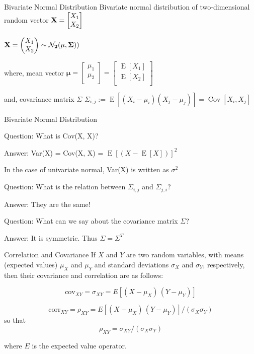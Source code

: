 \documentclass{beamer}
\begin{document}
\begin{frame}{Bivariate Normal Distribution}
Bivariate normal distribution of two-dimensional random vector $\bf{X} =\begin{bmatrix}
X_{1} \\
X_{2} \\
\end{bmatrix}
$

$
\bf{X} = \begin{pmatrix}
	X_1 \\
	X_2
\end{pmatrix}  \sim \mathcal{N}_2 (\mu ,\Sigma))
$

where, mean vector $\bm{\mu} =\begin{bmatrix}
\mu_{1} \\
\mu_{2} \\
\end{bmatrix}
=\begin{bmatrix}
\operatorname{E}[X_{1}] \\
\operatorname{E}[X_{2}] \\
\end{bmatrix}
$

and, covariance matrix $\Sigma$
$
\Sigma_{i,j} := \operatorname{E} [(X_i - \mu_i)( X_j - \mu_j)] = \operatorname{Cov}[X_i, X_j] $
\end{frame}

\begin{frame}{Bivariate Normal Distribution}

Question: What is Cov(X, X)?

Answer: Var(X) = Cov(X, X) =  $\operatorname{E}[(X - \operatorname{E}[X])]^2$

In the case of univariate normal, Var(X) is written as $\sigma^2$

Question: What is the relation between $\Sigma_{i, j}$ and $\Sigma_{j, i}$?

Answer: They are the same!

Question: What can we say about the covariance matrix $\Sigma$?

Answer: It is symmetric. Thus $\Sigma = \Sigma^T$
\end{frame}

\begin{frame}{Correlation and Covariance}
If $X$ and $Y$ are two random variables, with means (expected values) $\mu_X$ and $\mu_Y$ and standard deviations $\sigma_X$ and $\sigma_Y$, respectively, then their covariance and correlation are as follows:

$$\text{cov}_{XY} = \sigma_{XY} = E[(X-\mu_X)\,(Y-\mu_Y)] $$

$$	\text{corr}_{XY} = \rho_{XY} = E[(X-\mu_X)\,(Y-\mu_Y)]/(\sigma_X \sigma_Y)
$$
so that
$$
\rho_{XY} = \sigma_{XY} / (\sigma_X \sigma_Y) $$

where $E$ is the expected value operator. 
\end{frame}
\end{document}
